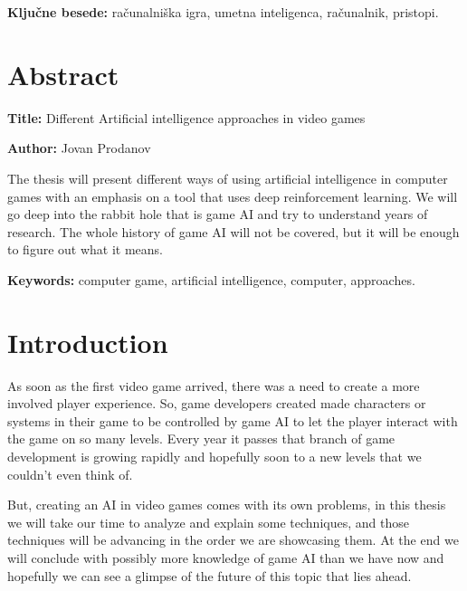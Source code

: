 \documentclass[a4paper, 12pt]{book}
\newcommand{\ttitleEn}{Different Artificial intelligence approaches in video games}
\newcommand{\tauthor}{Jovan Prodanov}
\newcommand{\tkeywords}{računalniška igra, umetna inteligenca, računalnik, pristopi}
\newcommand{\tkeywordsEn}{computer game, artificial intelligence, computer, approaches}
\newcommand{\clearemptydoublepage}{\newpage{\pagestyle{empty}\cleardoublepage}}
\begin{document}
\noindent\textbf{Ključne besede:} \tkeywords.
\clearemptydoublepage



\chapter*{Abstract}

\noindent\textbf{Title:} \ttitleEn
\bigskip

\noindent\textbf{Author:} \tauthor
\bigskip

\noindent 
The thesis will present different ways of using artificial intelligence in computer games with an emphasis on a tool that uses deep reinforcement learning.
We will go deep into the rabbit hole that is game AI and try to understand years of research. The whole history of game AI will not be covered, but it will be enough to figure out what it means.
\bigskip



\noindent\textbf{Keywords:} \tkeywordsEn.
\clearemptydoublepage



\mainmatter
\setcounter{page}{1}
\pagestyle{fancy}


\chapter{Introduction}

As soon as the first video game arrived, there was a need to create a more involved player experience. So, game developers created made characters or systems in their game to be controlled by game AI to let the player interact with the game on so many levels. Every year it passes that branch of game development is growing rapidly and hopefully soon to a new levels that we couldn't even think of.

But, creating an AI in video games comes with its own problems, in this thesis we will take our time to analyze and explain some techniques, and those techniques will be advancing in the order we are showcasing them. At the end we will conclude with possibly more knowledge of game AI than we have now and hopefully we can see a glimpse of the future of this topic that lies ahead.
\end{document}
